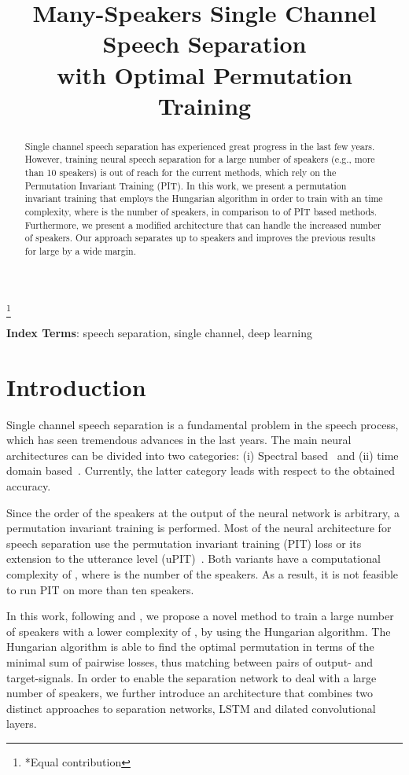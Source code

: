 \documentclass[a4paper]{article}
\title{Many-Speakers Single Channel Speech Separation\\ with Optimal Permutation Training}
\begin{document}
\maketitle
{\let\thefootnote\relax\footnote{{*Equal contribution}}}
\vspace{-.55cm}
\begin{abstract}
    Single channel speech separation has experienced great progress in the last few years. However, training neural speech separation for a large number of speakers (e.g., more than 10 speakers) is out of reach for the current methods, which rely on the Permutation Invariant Training (PIT).
    In this work, we present a permutation invariant training that employs the Hungarian algorithm in order to train with an  time complexity, where  is the number of speakers, in comparison to  of PIT based methods. Furthermore, we present a modified architecture that can handle the increased number of speakers. Our approach separates up to  speakers and improves the previous results for large  by a wide margin.
\end{abstract}
\noindent\textbf{Index Terms}: speech separation, single channel, deep learning

\section{Introduction}
Single channel speech separation is a fundamental problem in the speech process, which has seen tremendous advances in the last years. The main neural architectures can be divided into two categories: (i) Spectral based~\cite{wang2019deep,li2019spectral, wang2018end} and (ii) time domain based~\cite{luo2018tasnet, nachmani2020voice, zeghidour2020wavesplit}. Currently, the latter category leads with respect to the obtained accuracy.

Since the order of the speakers at the output of the neural network is arbitrary, a permutation invariant training is performed. Most of the neural architecture for speech separation use the permutation invariant training (PIT) loss \cite{yu2017permutation} or its extension to the utterance level (uPIT)~\cite{kolbaek2017multitalker}. Both variants have a computational complexity of , where  is the number of the speakers. As a result, it is not feasible to run PIT on more than ten speakers. 

In this work, following \cite{kanda2020serialized} and \cite{ma2020monaural}, we propose a novel method to train a large number of speakers with a lower complexity of , by using the Hungarian algorithm. The Hungarian algorithm is able to find the optimal permutation in terms of the minimal sum of pairwise losses, thus matching between pairs of output- and target-signals. In order to enable the separation network to deal with a large number of speakers, we further introduce an architecture that combines two distinct approaches to separation networks, LSTM and dilated convolutional layers.
\end{document}
